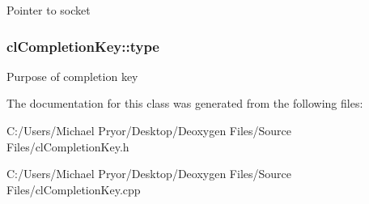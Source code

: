 \label{classcl_completion_key_a96e8a44f37704779a1715f72fd712da2}
Pointer to socket \hypertarget{classcl_completion_key_aa63f9e5342dac65b56fab6a424065aa9}{
\subsubsection[{type}]{ {\bf clCompletionKey::type}}}
\label{classcl_completion_key_aa63f9e5342dac65b56fab6a424065aa9}
Purpose of completion key 

The documentation for this class was generated from the following files:\begin{DoxyCompactItemize}
\item 
C:/Users/Michael Pryor/Desktop/Deoxygen Files/Source Files/clCompletionKey.h\item 
C:/Users/Michael Pryor/Desktop/Deoxygen Files/Source Files/clCompletionKey.cpp\end{DoxyCompactItemize}
